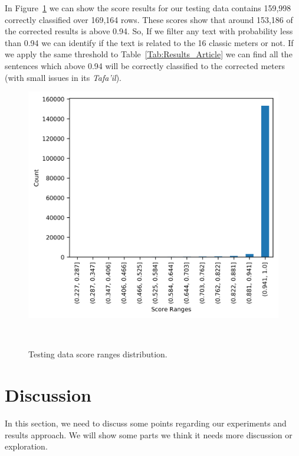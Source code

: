 
In Figure~\ref{Fig:Results_Distribution} we can show the score results for our testing data contains 159,998 correctly classified over 169,164 rows. These scores show that around 153,186 of the corrected results is above 0.94. So, If we filter any text with probability less than 0.94 we can identify if the text is related to the 16 classic meters or not. If we apply the same threshold to Table~\ref{Tab:Results_Article} we can find all the sentences which above 0.94 will be correctly classified to the corrected meters (with small issues in its \textit{Tafa’il}). 

\begin{figure}[!t]
  \includegraphics{./Figures/Ch_7_Results/IMG_Result_Distribution.png}
  \caption{Testing data score ranges distribution.}~\label{Fig:Results_Distribution}
\end{figure}

\clearpage

\section{Discussion}\label{Sec:Discussion}

In this section, we need to discuss some points regarding our experiments and results approach. We will show some parts we think it needs more discussion or exploration.


